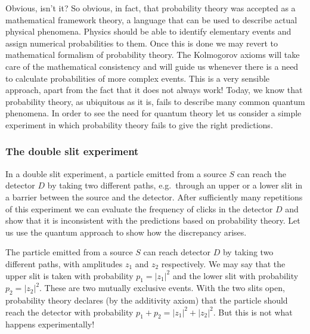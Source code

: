 \documentclass{article}
\begin{document}
Obvious, isn't it?
So obvious, in fact, that probability theory was accepted as a mathematical framework theory, a language that can be used to describe actual physical phenomena.
Physics should be able to identify elementary events and assign numerical probabilities to them.
Once this is done we may revert to mathematical formalism of probability theory.
The Kolmogorov axioms will take care of the mathematical consistency and will guide us whenever there is a need to calculate probabilities of more complex events.
This is a very sensible approach, apart from the fact that it does not always work!
Today, we know that probability theory, as ubiquitous as it is, fails to describe many common quantum phenomena.
In order to see the need for quantum theory let us consider a simple experiment in which probability theory fails to give the right predictions.

\hypertarget{the-double-slit-experiment}{%
\subsubsection{The double slit experiment}\label{the-double-slit-experiment}}

In a double slit experiment, a particle emitted from a source \(S\) can reach the detector \(D\) by taking two different paths, e.g.~through an upper or a lower slit in a barrier between the source and the detector.
After sufficiently many repetitions of this experiment we can evaluate the frequency of clicks in the detector \(D\) and show that it is inconsistent with the predictions based on probability theory.
Let us use the quantum approach to show how the discrepancy arises.

The particle emitted from a source \(S\) can reach detector \(D\) by taking two different paths, with amplitudes \(z_1\) and \(z_2\) respectively.
We may say that the upper slit is taken with probability \(p_1=|z_1|^2\) and the lower slit with probability \(p_2=|z_2|^2\).
These are two mutually exclusive events.
With the two slits open, probability theory declares (by the additivity axiom) that the particle should reach the detector with probability \(p_1+p_2= |z_1|^2+|z_2|^2\).
But this is not what happens experimentally!
\end{document}
